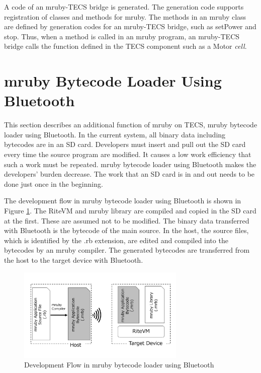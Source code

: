 \documentclass[conference,compsoc]{IEEEtran}
\begin{document}
A code of an mruby-TECS bridge is generated.
The generation code supports registration of classes and methods for mruby.
The methods in an mruby class are defined by generation codes for an mruby-TECS bridge, such as setPower and stop.
Thus, when a method is called in an mruby program, an mruby-TECS bridge calls the function defined in the TECS component such as a Motor {\it cell}.


\section{mruby Bytecode Loader Using Bluetooth}
\label{sec:mruby bytecode loader using Bluetooth}
This section describes an additional function of mruby on TECS, mruby bytecode loader using Bluetooth.
In the current system, all binary data including bytecodes are in an SD card.
Developers must insert and pull out the SD card every time the source program are modified.
It causes a low work efficiency that such a work must be repeated.
mruby bytecode loader using Bluetooth makes the developers' burden decrease.
The work that an SD card is in and out needs to be done just once in the beginning.

The development flow in mruby bytecode loader using Bluetooth is shown in Figure \ref{fig:bluetooth_loader}.
The RiteVM and mruby library are compiled and copied in the SD card at the first.
These are assumed not to be modified.
The binary data transferred with Bluetooth is the bytecode of the main source.
In the host, the source files, which is identified by the .rb extension, are edited and compiled into the bytecodes by an mruby compiler.
The generated bytecodes are transferred from the host to the target device with Bluetooth.

\begin{figure}[t]
    \centering
    \includegraphics[width=8cm,clip]{figure/bluetooth_loader.pdf}
    \caption{Development Flow in mruby bytecode loader using Bluetooth}
    \label{fig:bluetooth_loader}
\end{figure}
\end{document}
